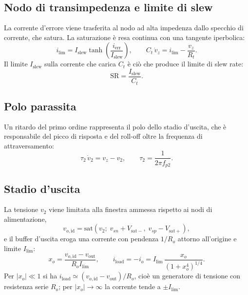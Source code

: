\documentclass[11pt,a4paper]{article}
\begin{document}
\subsection{Nodo di transimpedenza e limite di slew}

La corrente d'errore viene trasferita al nodo ad alta impedenza dallo
specchio di corrente, che satura. La saturazione è resa continua con una
tangente iperbolica:
\begin{equation}
  i_{\mathrm{lim}} = I_{\mathrm{slew}} \tanh\!\left(\frac{i_{\mathrm{err}}}{I_{\mathrm{slew}}}\right),
  \qquad
  C_t\,\dot v_z = i_{\mathrm{lim}} - \frac{v_z}{R_t}.
  \label{eq:tz}
\end{equation}
Il limite $I_{\mathrm{slew}}$ sulla corrente che carica $C_t$ è ciò che
produce il limite di slew rate:
\begin{equation}
  \mathrm{SR} = \frac{I_{\mathrm{slew}}}{C_t}.
  \label{eq:sr}
\end{equation}

\subsection{Polo parassita}

Un ritardo del primo ordine rappresenta il polo dello stadio d'uscita, che
è responsabile del picco di risposta e del roll-off oltre la frequenza di
attraversamento:
\begin{equation}
  \tau_2\,\dot v_2 = v_z - v_2,
  \qquad \tau_2 = \frac{1}{2\pi f_{p2}}.
\end{equation}

\subsection{Stadio d'uscita}

La tensione $v_2$ viene limitata alla finestra ammessa rispetto ai nodi di
alimentazione,
\begin{equation}
  v_{o,\mathrm{id}} = \mathrm{sat}\left(v_2;\; v_{sn}+V_{\mathrm{sat}-},\; v_{sp}-V_{\mathrm{sat}+}\right),
\end{equation}
e il buffer d'uscita eroga una corrente con pendenza $1/R_o$ attorno
all'origine e limite $I_{\mathrm{lim}}$:
\begin{equation}
  x_o = \frac{v_{o,\mathrm{id}} - v_{\mathrm{out}}}{R_o I_{\mathrm{lim}}},
  \qquad
  i_{\mathrm{load}} = -i_o = I_{\mathrm{lim}}\,\frac{x_o}{\left(1+x_o^{4}\right)^{1/4}} .
  \label{eq:iout}
\end{equation}
Per $|x_o|\ll 1$ si ha $i_{\mathrm{load}}\simeq (v_{o,\mathrm{id}}-v_{\mathrm{out}})/R_o$,
cioè un generatore di tensione con resistenza serie $R_o$; per
$|x_o|\to\infty$ la corrente tende a $\pm I_{\mathrm{lim}}$.
\end{document}
